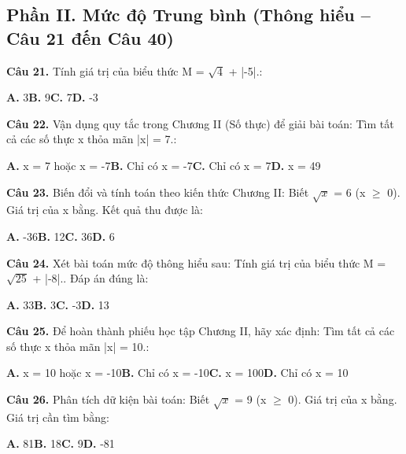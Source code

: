 \documentclass[11pt,a4paper]{article}
\begin{document}
\subsection*{\color{accent} Phần II. Mức độ Trung bình (Thông hiểu -- Câu 21 đến Câu 40)}
\textbf{\color{primary} Câu 21.} Tính giá trị của biểu thức M = $\sqrt{4}$ + |-5|.:\par
\hspace*{1.5em}\textbf{A.} 3\quad\quad \textbf{B.} 9\quad\quad \textbf{C.} 7\quad\quad \textbf{D.} -3\par\vspace{2pt}
\textbf{\color{primary} Câu 22.} Vận dụng quy tắc trong Chương II (Số thực) để giải bài toán: Tìm tất cả các số thực x thỏa mãn |x| = 7.:\par
\hspace*{1.5em}\textbf{A.} x = 7 hoặc x = -7\quad\quad \textbf{B.} Chỉ có x = -7\quad\quad \textbf{C.} Chỉ có x = 7\quad\quad \textbf{D.} x = 49\par\vspace{2pt}
\textbf{\color{primary} Câu 23.} Biến đổi và tính toán theo kiến thức Chương II: Biết $\sqrt{x}$ = 6 (x $\ge$ 0). Giá trị của x bằng. Kết quả thu được là:\par
\hspace*{1.5em}\textbf{A.} -36\quad\quad \textbf{B.} 12\quad\quad \textbf{C.} 36\quad\quad \textbf{D.} 6\par\vspace{2pt}
\textbf{\color{primary} Câu 24.} Xét bài toán mức độ thông hiểu sau: Tính giá trị của biểu thức M = $\sqrt{25}$ + |-8|.. Đáp án đúng là:\par
\hspace*{1.5em}\textbf{A.} 33\quad\quad \textbf{B.} 3\quad\quad \textbf{C.} -3\quad\quad \textbf{D.} 13\par\vspace{2pt}
\textbf{\color{primary} Câu 25.} Để hoàn thành phiếu học tập Chương II, hãy xác định: Tìm tất cả các số thực x thỏa mãn |x| = 10.:\par
\hspace*{1.5em}\textbf{A.} x = 10 hoặc x = -10\quad\quad \textbf{B.} Chỉ có x = -10\quad\quad \textbf{C.} x = 100\quad\quad \textbf{D.} Chỉ có x = 10\par\vspace{2pt}
\textbf{\color{primary} Câu 26.} Phân tích dữ kiện bài toán: Biết $\sqrt{x}$ = 9 (x $\ge$ 0). Giá trị của x bằng. Giá trị cần tìm bằng:\par
\hspace*{1.5em}\textbf{A.} 81\quad\quad \textbf{B.} 18\quad\quad \textbf{C.} 9\quad\quad \textbf{D.} -81\par\vspace{2pt}
\end{document}
